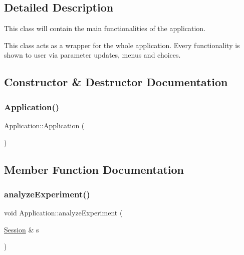 \subsection{Detailed Description}
This class will contain the main functionalities of the application. 

This class acts as a wrapper for the whole application. Every functionality is shown to user via parameter updates, menus and choices. 

\subsection{Constructor \& Destructor Documentation}
\mbox{\label{class_application_afa8cc05ce6b6092be5ecdfdae44e05f8}} 
\subsubsection{\texorpdfstring{Application()}{Application()}}
{\footnotesize\ttfamily Application\+::\+Application (\begin{DoxyParamCaption}{ }\end{DoxyParamCaption})\hspace{0.3cm}{\ttfamily [inline]}}



\subsection{Member Function Documentation}
\mbox{\label{class_application_ae0d3919fe03bae0b3ce31ef4be49374d}} 
\subsubsection{\texorpdfstring{analyze\+Experiment()}{analyzeExperiment()}}
{\footnotesize\ttfamily void Application\+::analyze\+Experiment (\begin{DoxyParamCaption}\item[{\hyperlink{struct_session}{Session} \&}]{s }\end{DoxyParamCaption})}

\mbox{\label{class_application_a169c37596e9a7a9e0546700876adcbe7}} 
